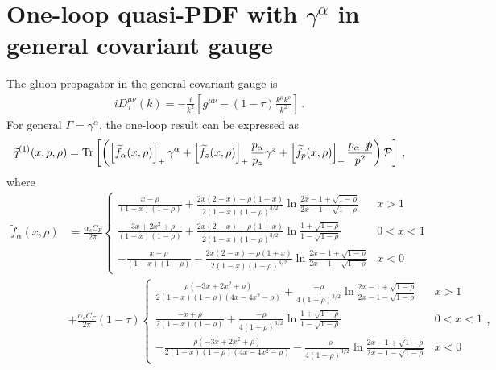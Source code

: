 \section{One-loop quasi-PDF with $\gamma^\alpha$ in general covariant gauge}\label{app:one-loop}
The gluon propagator in the general covariant gauge is
\begin{align}
iD_\tau^{\mu\nu}(k)=-\frac{i}{k^2}\left[g^{\mu\nu}-(1-\tau)\frac{k^\mu k^\nu}{k^2}\right]\,.
\end{align}
For general $\Gamma=\gamma^\alpha$, the one-loop result can be expressed as
\begin{align}
\widetilde{q}^{(1)}(x,p,\rho)=\mbox{Tr}\left[\left(\left[\widetilde{f}_\alpha(x,\rho)\right]_+\gamma^\alpha+\left[\widetilde{f}_z(x,\rho)\right]_+\frac{p_\alpha}{p_z}\gamma^z+\left[\widetilde{f}_p(x,\rho)\right]_+\frac{p_\alpha\slashed{p}}{p^2}\right){\cal P}\right]\,,
\end{align}
where
\begin{align}
\widetilde{f}_\alpha(x,\rho)&=\frac{\alpha_s C_F}{2\pi}\left\{
\begin{array}{lc}
\frac{x-\rho}{(1-x)(1-\rho)}+\frac{2x(2-x)-\rho(1+x)}{2(1-x)(1-\rho)^{3/2}}\ln\frac{2x-1+\sqrt{1-\rho}}{2x-1-\sqrt{1-\rho}} & x>1\\
\frac{-3x+2x^2+\rho}{(1-x)(1-\rho)}+\frac{2x(2-x)-\rho(1+x)}{2(1-x)(1-\rho)^{3/2}}\ln\frac{1+\sqrt{1-\rho}}{1-\sqrt{1-\rho}} & 0<x<1\\
-\frac{x-\rho}{(1-x)(1-\rho)}-\frac{2x(2-x)-\rho(1+x)}{2(1-x)(1-\rho)^{3/2}}\ln\frac{2x-1+\sqrt{1-\rho}}{2x-1-\sqrt{1-\rho}} & x<0
\end{array}\right.\nonumber\\
&+\frac{\alpha_s C_F}{2\pi}(1-\tau)\left\{
\begin{array}{lc}
\frac{\rho(-3x+2x^2+\rho)}{2(1-x)(1-\rho)(4x-4x^2-\rho)}+\frac{-\rho}{4(1-\rho)^{3/2}}\ln\frac{2x-1+\sqrt{1-\rho}}{2x-1-\sqrt{1-\rho}} & x>1\\
\frac{-x+\rho}{2(1-x)(1-\rho)}+\frac{-\rho}{4(1-\rho)^{3/2}}\ln\frac{1+\sqrt{1-\rho}}{1-\sqrt{1-\rho}} & 0<x<1\\
-\frac{\rho(-3x+2x^2+\rho)}{2(1-x)(1-\rho)(4x-4x^2-\rho)}-\frac{-\rho}{4(1-\rho)^{3/2}}\ln\frac{2x-1+\sqrt{1-\rho}}{2x-1-\sqrt{1-\rho}} & x<0
\end{array}\right.,
\end{align}
